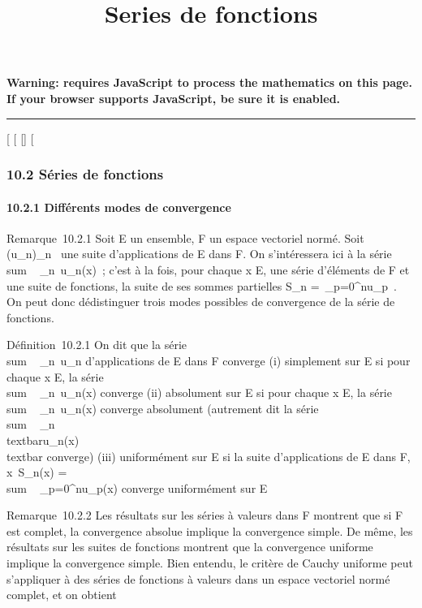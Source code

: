 \documentclass[]{article}
\title{Series de fonctions}
\author{}
\date{}
\begin{document}
\maketitle

\textbf{Warning: 
requires JavaScript to process the mathematics on this page.\\ If your
browser supports JavaScript, be sure it is enabled.}

\begin{center}\rule{3in}{0.4pt}\end{center}

{[}
{[}
{[}{]}
{[}

\subsubsection{10.2 Séries de fonctions}

\paragraph{10.2.1 Différents modes de convergence}

Remarque~10.2.1 Soit E un ensemble, F un espace vectoriel normé. Soit
(u\_n)\_n\in{}~ une suite d'applications de E dans F. On
s'intéressera ici à la série
\\sum ~
\_n\in{}~u\_n(x)~; c'est à la fois, pour chaque x \in E, une
série d'éléments de F et une suite de fonctions, la suite de ses sommes
partielles S\_n =\
\sum  \_p=0^nu\_p~. On peut
donc dé distinguer trois modes possibles de convergence de la série de
fonctions.

Définition~10.2.1 On dit que la série
\\sum ~
\_n\in{}~u\_n d'applications de E dans F converge (i)
simplement sur E si pour chaque x \in E, la série
\\sum ~
\_n\in{}~u\_n(x) converge (ii) absolument sur E si pour chaque
x \in E, la série \\sum ~
\_n\in{}~u\_n(x) converge absolument (autrement dit la série
\\sum ~
\_n\in{}~\\textbar{}u\_n(x)\\textbar{}
converge) (iii) uniformément sur E si la suite d'applications de E dans
F, x\mapsto~S\_n(x)
= \\sum ~
\_p=0^nu\_p(x) converge uniformément sur E

Remarque~10.2.2 Les résultats sur les séries à valeurs dans F montrent
que si F est complet, la convergence absolue implique la convergence
simple. De même, les résultats sur les suites de fonctions montrent que
la convergence uniforme implique la convergence simple. Bien entendu, le
critère de Cauchy uniforme peut s'appliquer à des séries de fonctions à
valeurs dans un espace vectoriel normé complet, et on obtient
\end{document}
